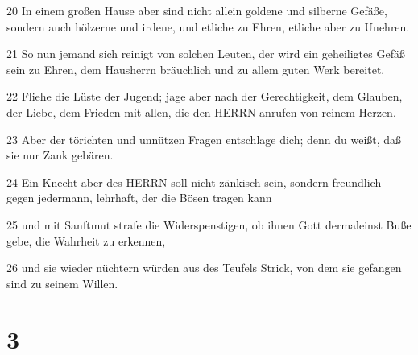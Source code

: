 \par 20 In einem großen Hause aber sind nicht allein goldene und silberne Gefäße, sondern auch hölzerne und irdene, und etliche zu Ehren, etliche aber zu Unehren.
\par 21 So nun jemand sich reinigt von solchen Leuten, der wird ein geheiligtes Gefäß sein zu Ehren, dem Hausherrn bräuchlich und zu allem guten Werk bereitet.
\par 22 Fliehe die Lüste der Jugend; jage aber nach der Gerechtigkeit, dem Glauben, der Liebe, dem Frieden mit allen, die den HERRN anrufen von reinem Herzen.
\par 23 Aber der törichten und unnützen Fragen entschlage dich; denn du weißt, daß sie nur Zank gebären.
\par 24 Ein Knecht aber des HERRN soll nicht zänkisch sein, sondern freundlich gegen jedermann, lehrhaft, der die Bösen tragen kann
\par 25 und mit Sanftmut strafe die Widerspenstigen, ob ihnen Gott dermaleinst Buße gebe, die Wahrheit zu erkennen,
\par 26 und sie wieder nüchtern würden aus des Teufels Strick, von dem sie gefangen sind zu seinem Willen.

\chapter{3}

